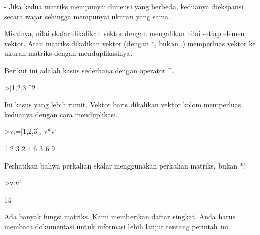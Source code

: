 \documentclass[a4paper,10pt]{article}
\begin{document}
\begin{eulernotebook}
\begin{eulercomment}
\begin{eulercomment}
\begin{eulercomment}
\begin{eulercomment}
\begin{eulercomment}
\begin{eulercomment}
\begin{eulercomment}
\begin{eulercomment}
\begin{eulercomment}
- Jika kedua matriks mempunyai dimensi yang berbeda, keduanya
diekspansi secara wajar sehingga mempunyai ukuran yang sama.

Misalnya, nilai skalar dikalikan vektor dengan mengalikan nilai setiap
elemen vektor. Atau matriks dikalikan vektor (dengan *, bukan .)
memperluas vektor ke ukuran matriks dengan menduplikasinya.

Berikut ini adalah kasus sederhana dengan operator \textasciicircum{}.
\end{eulercomment}
\begin{eulerprompt}
>[1,2,3]^2
\end{eulerprompt}
\begin{euleroutput}
  [1,  4,  9]
\end{euleroutput}
\begin{eulercomment}
Ini kasus yang lebih rumit. Vektor baris dikalikan vektor kolom
memperluas keduanya dengan cara menduplikasi.
\end{eulercomment}
\begin{eulerprompt}
>v:=[1,2,3]; v*v'
\end{eulerprompt}
\begin{euleroutput}
              1             2             3 
              2             4             6 
              3             6             9 
\end{euleroutput}
\begin{eulercomment}
Perhatikan bahwa perkalian skalar menggunakan perkalian matriks, bukan
*!
\end{eulercomment}
\begin{eulerprompt}
>v.v'
\end{eulerprompt}
\begin{euleroutput}
  14
\end{euleroutput}
\begin{eulercomment}
Ada banyak fungsi matriks. Kami memberikan daftar singkat. Anda harus
membaca dokumentasi untuk informasi lebih lanjut tentang perintah ini.


\end{eulercomment}
\end{eulercomment}
\end{eulercomment}
\end{eulercomment}
\end{eulercomment}
\end{eulercomment}
\end{eulercomment}
\end{eulercomment}
\end{eulercomment}
\end{eulernotebook}
\end{document}
